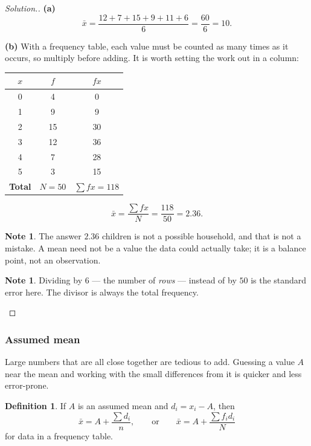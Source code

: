 \documentclass[11pt,a4paper]{article}
\theoremstyle{definition}
\newtheorem{definition}[thm]{Definition}
\newtheorem{note}[thm]{Note}
\newenvironment{solution}
  {\renewcommand{\qedsymbol}{}\begin{proof}[\textit{Solution}.]}
  {\end{proof}}
\begin{document}
\begin{solution}
\textbf{(a)}
$$\bar{x}=\frac{12+7+15+9+11+6}{6}=\frac{60}{6}=10.$$

\textbf{(b)} With a frequency table, each value must be counted as many times as it
occurs, so multiply before adding. It is worth setting the work out in a column:

\begin{table}[H]
\centering
\begin{tabular}{|c|c|c|}
\hline
$x$ & $f$ & $fx$\\
\hline
0 & 4 & 0\\
1 & 9 & 9\\
2 & 15 & 30\\
3 & 12 & 36\\
4 & 7 & 28\\
5 & 3 & 15\\
\hline
\textbf{Total} & $N=50$ & $\sum fx=118$\\
\hline
\end{tabular}
\end{table}

$$\bar{x}=\frac{\sum fx}{N}=\frac{118}{50}=2.36.$$

\begin{note}
The answer $2.36$ children is not a possible household, and that is not a mistake. A
mean need not be a value the data could actually take; it is a balance point, not an
observation.
\end{note}

\begin{note}
Dividing by $6$ --- the number of \emph{rows} --- instead of by $50$ is the standard
error here. The divisor is always the total frequency.
\end{note}
\end{solution}

\subsubsection{Assumed mean}

Large numbers that are all close together are tedious to add. Guessing a value $A$ near
the mean and working with the small differences from it is quicker and less error-prone.

\begin{definition}
If $A$ is an assumed mean and $d_i=x_i-A$, then
$$\bar{x}=A+\frac{\sum d_i}{n},\qquad\text{or}\qquad \bar{x}=A+\frac{\sum f_id_i}{N}$$
for data in a frequency table.
\end{definition}
\end{document}
